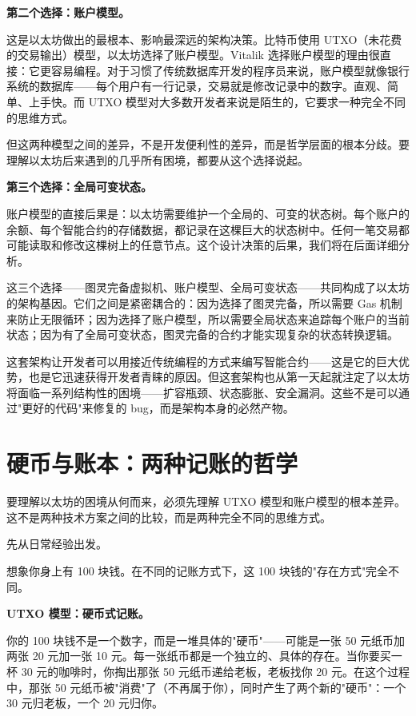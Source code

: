 \documentclass[a4paper,12pt,openany]{ctexbook}
\begin{document}
\textbf{第二个选择：账户模型。}

这是以太坊做出的最根本、影响最深远的架构决策。比特币使用 UTXO（未花费的交易输出）模型，以太坊选择了账户模型。Vitalik 选择账户模型的理由很直接：它更容易编程。对于习惯了传统数据库开发的程序员来说，账户模型就像银行系统的数据库——每个用户有一行记录，交易就是修改记录中的数字。直观、简单、上手快。而 UTXO 模型对大多数开发者来说是陌生的，它要求一种完全不同的思维方式。

但这两种模型之间的差异，不是开发便利性的差异，而是哲学层面的根本分歧。要理解以太坊后来遇到的几乎所有困境，都要从这个选择说起。

\textbf{第三个选择：全局可变状态。}

账户模型的直接后果是：以太坊需要维护一个全局的、可变的状态树。每个账户的余额、每个智能合约的存储数据，都记录在这棵巨大的状态树中。任何一笔交易都可能读取和修改这棵树上的任意节点。这个设计决策的后果，我们将在后面详细分析。

这三个选择——图灵完备虚拟机、账户模型、全局可变状态——共同构成了以太坊的架构基因。它们之间是紧密耦合的：因为选择了图灵完备，所以需要 Gas 机制来防止无限循环；因为选择了账户模型，所以需要全局状态来追踪每个账户的当前状态；因为有了全局可变状态，图灵完备的合约才能实现复杂的状态转换逻辑。

这套架构让开发者可以用接近传统编程的方式来编写智能合约——这是它的巨大优势，也是它迅速获得开发者青睐的原因。但这套架构也从第一天起就注定了以太坊将面临一系列结构性的困境——扩容瓶颈、状态膨胀、安全漏洞。这些不是可以通过"更好的代码"来修复的 bug，而是架构本身的必然产物。


\section*{硬币与账本：两种记账的哲学}


要理解以太坊的困境从何而来，必须先理解 UTXO 模型和账户模型的根本差异。这不是两种技术方案之间的比较，而是两种完全不同的思维方式。

先从日常经验出发。

想象你身上有 100 块钱。在不同的记账方式下，这 100 块钱的"存在方式"完全不同。

\textbf{UTXO 模型：硬币式记账。}

你的 100 块钱不是一个数字，而是一堆具体的"硬币"——可能是一张 50 元纸币加两张 20 元加一张 10 元。每一张纸币都是一个独立的、具体的存在。当你要买一杯 30 元的咖啡时，你掏出那张 50 元纸币递给老板，老板找你 20 元。在这个过程中，那张 50 元纸币被"消费"了（不再属于你），同时产生了两个新的"硬币"：一个 30 元归老板，一个 20 元归你。
\end{document}
